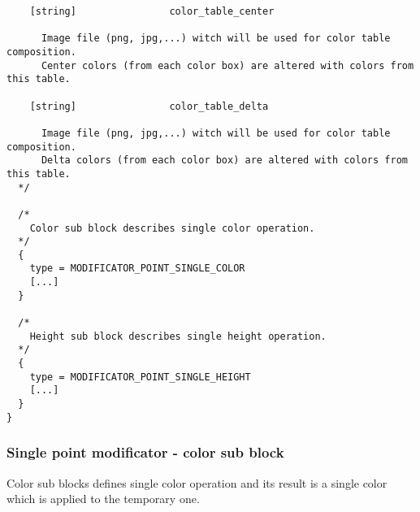 \documentclass[9pt]{article}
\begin{document}
\begin{verbatim}
    [string]                color_table_center
    
      Image file (png, jpg,...) witch will be used for color table composition. 
      Center colors (from each color box) are altered with colors from this table.
      
    [string]                color_table_delta    
    
      Image file (png, jpg,...) witch will be used for color table composition. 
      Delta colors (from each color box) are altered with colors from this table.
  */
  
  /*
    Color sub block describes single color operation.
  */
  {
    type = MODIFICATOR_POINT_SINGLE_COLOR
    [...]
  }
  
  /*
    Height sub block describes single height operation.
  */
  {
    type = MODIFICATOR_POINT_SINGLE_HEIGHT
    [...]
  }
}
\end{verbatim}

\subsubsection{Single point modificator - color sub block}

Color sub blocks defines single color operation and its result
is a single color which is applied to the temporary one.
\end{document}
